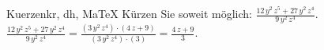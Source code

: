 \begin{MAufgabe}{Kuerzen}{kr, dh, MaTeX}
K\"urzen Sie soweit m\"oglich: $\frac{12\, y^2\, z^5 + 27\, y^2\, z^4}{9\, y^2\, z^4}$.\\ 
\ifLsg\MLoesung
\quad $\frac{12\, y^2\, z^5 + 27\, y^2\, z^4}{9\, y^2\, z^4}=\frac{(3\, y^2\, z^4)\cdot(4\, z + 9)}{(3\, y^2\, z^4)\cdot(3)}=\frac{4\, z + 9}{3}$.\else\relax\fi
 \end{MAufgabe}
